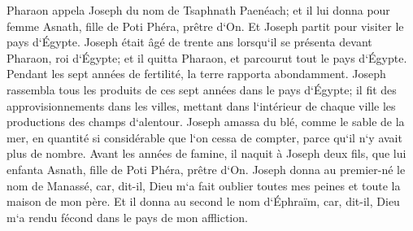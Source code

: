 \verse Pharaon appela Joseph du nom de Tsaphnath Paenéach; et il lui donna pour femme Asnath, fille de Poti Phéra, prêtre d`On. Et Joseph partit pour visiter le pays d`Égypte. 
\verse Joseph était âgé de trente ans lorsqu`il se présenta devant Pharaon, roi d`Égypte; et il quitta Pharaon, et parcourut tout le pays d`Égypte. 
\verse Pendant les sept années de fertilité, la terre rapporta abondamment. 
\verse Joseph rassembla tous les produits de ces sept années dans le pays d`Égypte; il fit des approvisionnements dans les villes, mettant dans l`intérieur de chaque ville les productions des champs d`alentour. 
\verse Joseph amassa du blé, comme le sable de la mer, en quantité si considérable que l`on cessa de compter, parce qu`il n`y avait plus de nombre. 
\verse Avant les années de famine, il naquit à Joseph deux fils, que lui enfanta Asnath, fille de Poti Phéra, prêtre d`On. 
\verse Joseph donna au premier-né le nom de Manassé, car, dit-il, Dieu m`a fait oublier toutes mes peines et toute la maison de mon père. 
\verse Et il donna au second le nom d`Éphraïm, car, dit-il, Dieu m`a rendu fécond dans le pays de mon affliction. 
